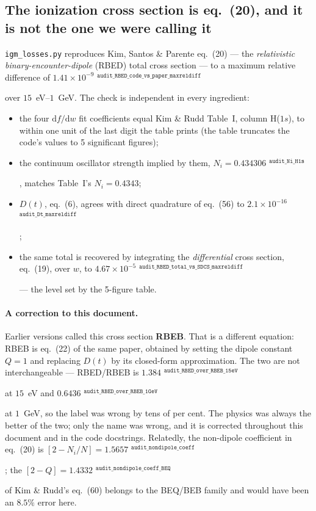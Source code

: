 \documentclass[11pt,a4paper]{article}
\newif\ifprovdraft
\newcommand{\src}[1]{%
  \ifprovdraft
    \ifmmode{}^{\text{\color{gray}\scriptsize\texttt{#1}}}%
    \else{\color{gray}\scriptsize$^{\texttt{#1}}$}%
    \fi
  \fi}
\begin{document}
\subsection{The ionization cross section is \texorpdfstring{eq.~(20)}{eq. (20)},
            and it is not the one we were calling it}
\texttt{igm\_losses.py} reproduces Kim, Santos \& Parente eq.~(20) --- the
\emph{relativistic binary-encounter-dipole} (RBED) total cross section --- to a
maximum relative difference of
$1.41\times10^{-9}$\src{audit\_RBED\_code\_vs\_paper\_maxreldiff} over
$15$~eV--$1$~GeV. The check is independent in every ingredient:
\begin{itemize}\itemsep2pt
\item the four $\mathrm{d}f/\mathrm{d}w$ fit coefficients equal Kim \& Rudd
      Table~I, column H($1s$), to within one unit of the last digit the table
      prints (the table truncates the code's values to 5 significant figures);
\item the continuum oscillator strength implied by them,
      $N_i = 0.434306$\src{audit\_Ni\_H1s}, matches Table~I's $N_i = 0.4343$;
\item $D(t)$, eq.~(6), agrees with direct quadrature of eq.~(56) to
      $2.1\times10^{-16}$\src{audit\_Dt\_maxreldiff};
\item the same total is recovered by integrating the \emph{differential} cross
      section, eq.~(19), over $w$, to
      $4.67\times10^{-5}$\src{audit\_RBED\_total\_vs\_SDCS\_maxreldiff} --- the
      level set by the 5-figure table.
\end{itemize}

\paragraph{A correction to this document.} Earlier versions called this cross
section \textbf{RBEB}. That is a different equation: RBEB is eq.~(22) of the same
paper, obtained by setting the dipole constant $Q=1$ and replacing $D(t)$ by its
closed-form approximation. The two are not interchangeable --- RBED/RBEB is
$1.384$\src{audit\_RBED\_over\_RBEB\_15eV} at $15$~eV and
$0.6436$\src{audit\_RBED\_over\_RBEB\_1GeV} at $1$~GeV, so the label was wrong by
tens of per cent. The physics was always the better of the two; only the name was
wrong, and it is corrected throughout this document and in the code docstrings.
Relatedly, the non-dipole coefficient in eq.~(20) is $[2-N_i/N] =
1.5657$\src{audit\_nondipole\_coeff}; the $[2-Q] =
1.4332$\src{audit\_nondipole\_coeff\_BEQ} of Kim \& Rudd's eq.~(60) belongs to
the BEQ/BEB family and would have been an $8.5\%$ error here.
\end{document}
